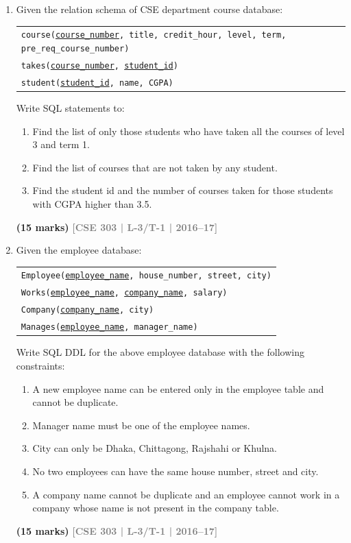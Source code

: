 \documentclass[12pt,a3paper]{article}
\newcommand{\yr}[1]{\hfill\textcolor{gray}{\small\textbf{[#1]}}}
\newcommand{\mk}[1]{\textcolor{orange!70!black}{\small\textbf{(#1 marks)}}}
\begin{document}
\begin{enumerate}
\item Given the relation schema of CSE department course database:
\begin{center}
\begin{tabular}{l}
\texttt{course(\underline{course\_number}, title, credit\_hour, level, term, pre\_req\_course\_number)}\\
\texttt{takes(\underline{course\_number}, \underline{student\_id})}\\
\texttt{student(\underline{student\_id}, name, CGPA)}
\end{tabular}
\end{center}
Write SQL statements to:
\begin{enumerate}
  \item Find the list of only those students who have taken all the courses of level 3 and term 1.
  \item Find the list of courses that are not taken by any student.
  \item Find the student id and the number of courses taken for those students with CGPA higher than 3.5.
\end{enumerate}
\mk{15} \yr{CSE 303 | L-3/T-1 | 2016--17}

\item Given the employee database:
\begin{center}
\begin{tabular}{l}
\texttt{Employee(\underline{employee\_name}, house\_number, street, city)}\\
\texttt{Works(\underline{employee\_name}, \underline{company\_name}, salary)}\\
\texttt{Company(\underline{company\_name}, city)}\\
\texttt{Manages(\underline{employee\_name}, manager\_name)}
\end{tabular}
\end{center}
Write SQL DDL for the above employee database with the following constraints:
\begin{enumerate}
  \item A new employee name can be entered only in the employee table and cannot be duplicate.
  \item Manager name must be one of the employee names.
  \item City can only be Dhaka, Chittagong, Rajshahi or Khulna.
  \item No two employees can have the same house number, street and city.
  \item A company name cannot be duplicate and an employee cannot work in a company whose name is not present in the company table.
\end{enumerate}
\mk{15} \yr{CSE 303 | L-3/T-1 | 2016--17}


\end{enumerate}
\end{document}
